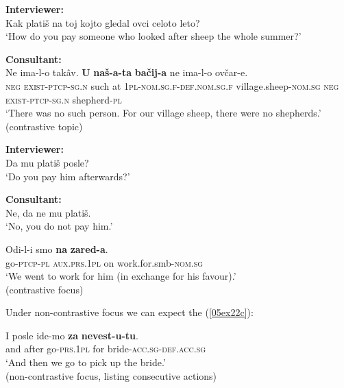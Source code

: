 \documentclass[output=paper,colorlinks,citecolor=brown]{langscibook}
\begin{document}
\begin{exe}
	\ex \label{05ex22}
	\begin{xlist}
		\ex
		\textbf{Interviewer:} \\
		Kak platiš na toj kojto gledal ovci celoto leto? \\
		‘How do you pay someone who looked after sheep the whole summer?’
		
		\medskip
		
		\textbf{Consultant:} \\
		\gll Ne ima-l-o takâv. \textbf{U} \textbf{naš-a-ta} \textbf{bačij-a} ne ima-l-o ovčar-e. \\
		\textsc{neg} \textsc{exist-ptcp-sg.n} such at \textsc{1pl}-\textsc{nom.sg.f-def.nom.sg.f} village.sheep-\textsc{nom.sg} \textsc{neg} \textsc{exist-ptcp-sg.n} shepherd-\textsc{pl} \\
		\trans ‘There was no such person. For our village sheep, there were no shepherds.’ \hfill (contrastive topic)
		
		\ex
		\textbf{Interviewer:} \\
		Da mu platiš posle? \\
		‘Do you pay him afterwards?’
		
		\medskip
		
		\textbf{Consultant:} \\
		Ne, da ne mu platiš. \\
		‘No, you do not pay him.’
		
		\gll Odi-l-i smo \textbf{na} \textbf{zared-a}. \\
		go-\textsc{ptcp-pl} \textsc{aux.prs.1pl} on work.for.smb-\textsc{nom.sg} \\
		\trans ‘We went to work for him (in exchange for his favour).’ \\
		\hfill (contrastive focus)


\medskip

\item[]  %
\noindent\hspace*{-4.5em}\parbox{\textwidth}{Under non-contrastive focus we can expect the  (\ref{05ex22c}):}

\medskip

	\ex \label{05ex22c}
	\gll  I posle ide-mo \textbf{za} \textbf{nevest-u-tu}. \\
	and after go-\textsc{prs.1pl} for bride\textsc{-acc.sg-def.acc.sg}  \\
	\trans ‘And then we go to pick up the bride.’ \\
	\hfill (non-contrastive focus, listing consecutive actions)
	\end{xlist}
\end{exe}
\end{document}
